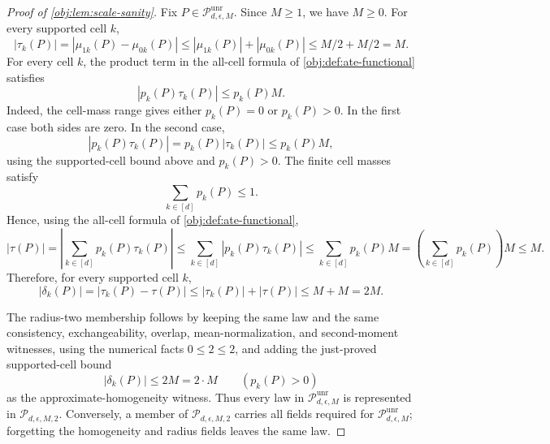\documentclass[11pt]{article}
\begin{document}
\begin{proof}[Proof of \cref{obj:lem:scale-sanity}]
Fix \(P\in\mathcal P_{d,\epsilon,M}^{\mathrm{unr}}\).  Since \(M\ge1\), we have \(M\ge0\).  For every supported cell \(k\),
\[
|\tau_k(P)|
=
|\mu_{1k}(P)-\mu_{0k}(P)|
\le |\mu_{1k}(P)|+|\mu_{0k}(P)|
\le M/2+M/2
=M .
\]
For every cell \(k\), the product term in the all-cell formula of \cref{obj:def:ate-functional} satisfies
\[
|p_k(P)\tau_k(P)|\le p_k(P)M .
\]
Indeed, the cell-mass range gives either \(p_k(P)=0\) or \(p_k(P)>0\).  In the first case both sides are zero.  In the second case,
\[
|p_k(P)\tau_k(P)|
=p_k(P)|\tau_k(P)|
\le p_k(P)M,
\]
using the supported-cell bound above and \(p_k(P)>0\). %
The finite cell masses satisfy
\[
\sum_{k\in[d]}p_k(P)\le1 .
\]
Hence, using the all-cell formula of \cref{obj:def:ate-functional},
\[
|\tau(P)|
=
\left|\sum_{k\in[d]}p_k(P)\tau_k(P)\right|
\le
\sum_{k\in[d]}|p_k(P)\tau_k(P)|
\le
\sum_{k\in[d]}p_k(P)M
=
\left(\sum_{k\in[d]}p_k(P)\right)M
\le M .
\]
Therefore, for every supported cell \(k\),
\[
|\delta_k(P)|
=
|\tau_k(P)-\tau(P)|
\le |\tau_k(P)|+|\tau(P)|
\le M+M
=
2M .
\]

The radius-two membership follows by keeping the same law and the same consistency, exchangeability, overlap, mean-normalization, and second-moment witnesses, using the numerical facts \(0\le2\le2\), and adding the just-proved supported-cell bound
\[
|\delta_k(P)|\le 2M=2\cdot M
\qquad (p_k(P)>0)
\]
as the approximate-homogeneity witness. %
Thus every law in \(\mathcal P_{d,\epsilon,M}^{\mathrm{unr}}\) is represented in \(\mathcal P_{d,\epsilon,M,2}\).  Conversely, a member of \(\mathcal P_{d,\epsilon,M,2}\) carries all fields required for \(\mathcal P_{d,\epsilon,M}^{\mathrm{unr}}\); forgetting the homogeneity and radius fields leaves the same law. %
\end{proof}
\end{document}
